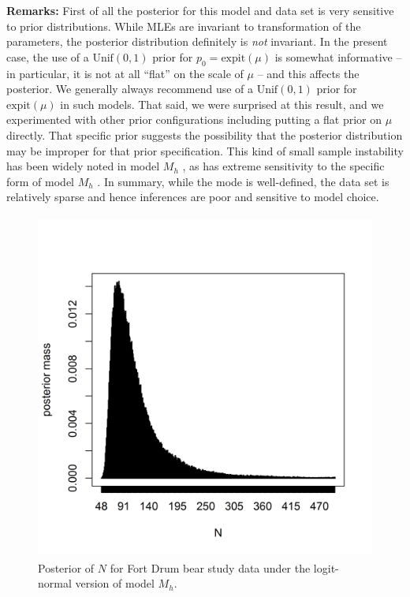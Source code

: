 {\bf Remarks:}
First of all the posterior for this model and data set is
very sensitive to prior distributions. While MLEs are invariant to
transformation of the parameters, the posterior distribution
definitely is {\it not} invariant. In the present case, the use of a
$\mbox{Unif}(0,1)$ prior for $p_{0} = \mbox{expit}(\mu)$ is somewhat
informative -- in particular, it is not at all ``flat'' on the scale
of $\mu$ -- and this affects the posterior.  We generally always
recommend use of a $\mbox{Unif}(0,1)$ prior for $\mbox{expit}(\mu)$ in such
models. That said, we were surprised at this result, and we
experimented with other prior configurations including putting a flat
prior on $\mu$ directly. That specific prior suggests the possibility
that the posterior distribution may be improper for that prior
specification. This kind of small sample instability has been widely
noted in model $M_h$ \citep{fienberg_etal:1999, dorazio_royle:2003},
as has extreme sensitivity to the specific form of model $M_{h}$ \citep{link:2003}.
In summary, while the mode is well-defined, the data set is relatively
sparse and hence inferences are poor and sensitive to model choice.

\begin{figure}
\centering
\includegraphics[height=4.5in,width=4.5in]{Ch3/figs/bear-modelMh-post}
\caption{Posterior of $N$ for Fort Drum bear study data under the
logit-normal version of model $M_h$.
}
\label{closed.fig.bearMh}
\end{figure}




